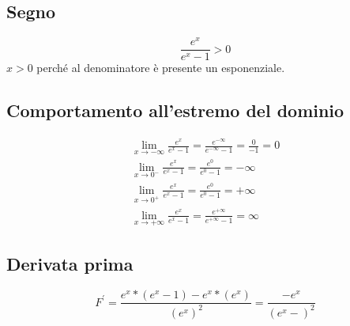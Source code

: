 \documentclass{article}
\begin{document}
	\subsection{Segno}
		\begin{equation*}
			\frac{e^x}{e^x-1}>0
		\end{equation*}
	$x>0$ perché al denominatore è presente un esponenziale.
	\subsection{Comportamento all'estremo del dominio}
		\begin{equation*}
			\begin{matrix}
				\lim_{x\to
				-\infty}\frac{e^x}{e^x-1}=\frac{e^{-\infty}}{e^{-\infty}-1}=\frac{0}{-1}=0\\
				\lim_{x\to 0^-} \frac{e^x}{e^x-1}=\frac{e^0}{e^0-1}=-\infty\\
				\lim_{x\to 0^+} \frac{e^x}{e^x-1}=\frac{e^0}{e^0-1}=+\infty\\
				\lim_{x\to
				+\infty}\frac{e^x}{e^x-1}=\frac{e^{+\infty}}{e^{+\infty}-1}=\infty
			\end{matrix}
		\end{equation*}
	\subsection{Derivata prima}
		\begin{equation*}
			F^\prime=\frac{e^x*(e^x-1)-e^x*(e^x)}{(e^x)^2}=\frac{-e^x}{(e^x-)^2}
		\end{equation*}
\end{document}
